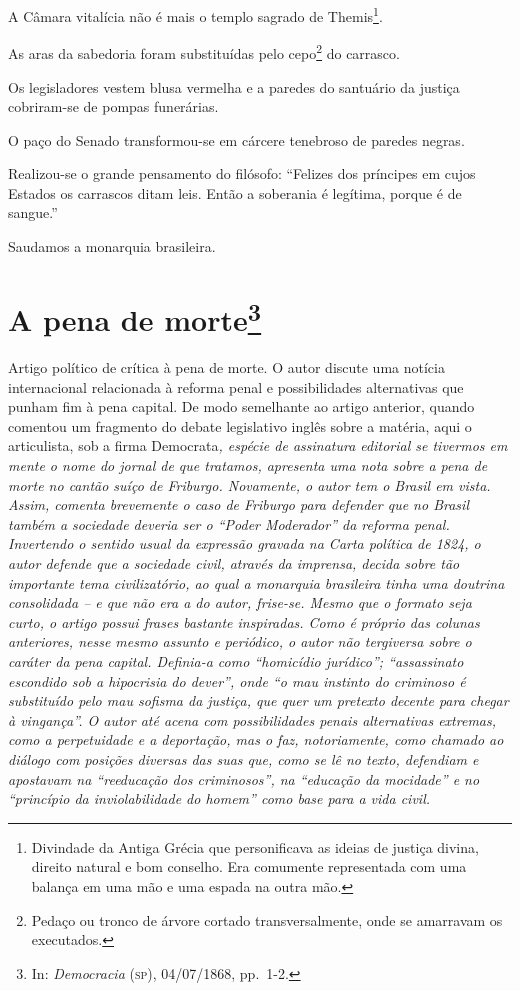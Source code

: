 A Câmara vitalícia não é mais o templo sagrado de Themis\footnote{
  Divindade da Antiga Grécia que personificava as ideias de justiça
  divina, direito natural e bom conselho. Era comumente representada com
  uma balança em uma mão e uma espada na outra mão.}.

As aras da sabedoria foram substituídas pelo cepo\footnote{Pedaço ou
  tronco de árvore cortado transversalmente, onde se amarravam os
  executados.} do carrasco.

Os legisladores vestem blusa vermelha e a paredes do santuário da
justiça cobriram-se de pompas funerárias.

O paço do Senado transformou-se em cárcere tenebroso de paredes negras.

Realizou-se o grande pensamento do filósofo: ``Felizes dos príncipes em
cujos Estados os carrascos ditam leis. Então a soberania é legítima,
porque é de sangue.''

Saudamos a monarquia brasileira.

\chapter{A pena de morte\footnote{In: \emph{Democracia} (\textsc{sp}), 04/07/1868, pp.~1-2.}}

\begin{didascalia}
Artigo político de crítica à pena de morte. O autor discute uma notícia
internacional relacionada à reforma penal e possibilidades alternativas
que punham fim à pena capital. De modo semelhante ao artigo anterior,
quando comentou um fragmento do debate legislativo inglês sobre a
matéria, aqui o articulista, sob a firma Democrata\emph{, espécie de
assinatura editorial se tivermos em mente o nome do jornal de que
tratamos, apresenta uma nota sobre a pena de morte no cantão suíço de
Friburgo. Novamente, o autor tem o Brasil em vista. Assim, comenta
brevemente o caso de Friburgo para defender que no Brasil também a
sociedade deveria ser o ``Poder Moderador'' da reforma penal. Invertendo o
sentido usual da expressão gravada na Carta política de 1824, o autor
defende que a sociedade civil, através da imprensa, decida sobre tão
importante tema civilizatório, ao qual a monarquia brasileira tinha uma
doutrina consolidada -- e que não era a do autor, frise-se. Mesmo que o
formato seja curto, o artigo possui frases bastante inspiradas. Como é
próprio das colunas anteriores, nesse mesmo assunto e periódico, o autor
não tergiversa sobre o caráter da pena capital. Definia-a como
``homicídio jurídico''; ``assassinato escondido sob a hipocrisia do dever'',
onde ``o mau instinto do criminoso é substituído pelo mau sofisma da
justiça, que quer um pretexto decente para chegar à vingança''. O autor
até acena com possibilidades penais alternativas extremas, como a
perpetuidade e a deportação, mas o faz, notoriamente, como chamado ao
diálogo com posições diversas das suas que, como se lê no texto,
defendiam e apostavam na ``reeducação dos criminosos'', na ``educação da
mocidade'' e no ``princípio da inviolabilidade do homem'' como base para a
vida civil.}
\end{didascalia}



